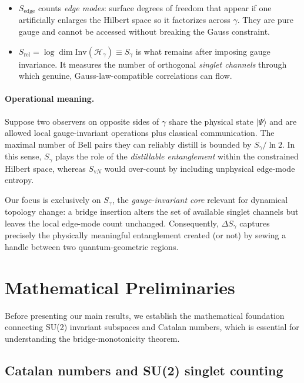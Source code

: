 \documentclass[11pt, a4paper]{article}
\theoremstyle{plain}
\theoremstyle{definition}
\theoremstyle{remark}
\newcommand{\Hil}{\mathcal{H}}
\newcommand{\Inv}{\mathrm{Inv}}
\begin{document}
\begin{itemize}\setlength\itemsep{4pt}
\item
$S_{\text{edge}}$ counts \emph{edge modes}: surface degrees of freedom that appear if one artificially enlarges the Hilbert space so it factorizes across $\gamma$. They are pure gauge and cannot be accessed without breaking the Gauss constraint.
\item
$S_{\text{rel}}=\log\dim\Inv(\Hil_{\gamma})\equiv S_{\gamma}$
is what remains after imposing gauge invariance. It measures the number of orthogonal \emph{singlet channels} through which genuine, Gauss-law-compatible correlations can flow.
\end{itemize}

\paragraph{Operational meaning.}
Suppose two observers on opposite sides of $\gamma$ share the physical state $|\Psi\rangle$ and are allowed local gauge-invariant operations plus classical communication. The maximal number of Bell pairs they can reliably distill is bounded by $S_{\gamma}/\ln2$. In this sense, $S_{\gamma}$ plays the role of the \emph{distillable entanglement} within the constrained Hilbert space, whereas $S_{\mathrm vN}$ would over-count by including unphysical edge-mode entropy.

Our focus is exclusively on $S_{\gamma}$, the \emph{gauge-invariant core} relevant for dynamical topology change: a bridge insertion alters the set of available singlet channels but leaves the local edge-mode count unchanged. Consequently, $\Delta S_{\gamma}$ captures precisely the physically meaningful entanglement created (or not) by sewing a handle between two quantum-geometric regions.

\section{Mathematical Preliminaries}
\label{sec:math_prelim}

Before presenting our main results, we establish the mathematical foundation connecting SU(2) invariant subspaces and Catalan numbers, which is essential for understanding the bridge-monotonicity theorem.

\subsection{Catalan numbers and SU(2) singlet counting}
\label{sec:catalan}
\end{document}

